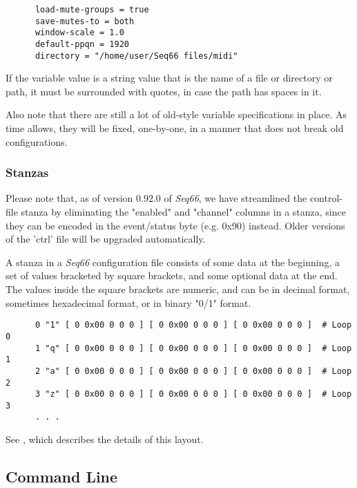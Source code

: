    \begin{verbatim}
      load-mute-groups = true
      save-mutes-to = both
      window-scale = 1.0
      default-ppqn = 1920
      directory = "/home/user/Seq66 files/midi"
   \end{verbatim}

   If the variable value is a string value that is the name of a file or
   directory or path, it must be surrounded with quotes, in case the path has
   spaces in it.

   Also note that there are still a lot of old-style variable specifications in
   place.  As time allows, they will be fixed, one-by-one, in a manner that
   does not break old configurations.

\subsubsection{Stanzas}
\label{subsec:configuration_common_stanzas}

   Please note that, as of version 0.92.0 of \textsl{Seq66}, we have
   streamlined the control-file stanza by eliminating the "enabled" and
   "channel" columns in a stanza, since they can be encoded in the event/status
   byte (e.g. 0x90) instead.  Older versions of the 'ctrl' file will be
   upgraded automatically.

   A stanza in a \textsl{Seq66} configuration file consists of some data at the
   beginning, a set of values bracketed by square brackets, and some optional
   data at the end.  The values inside the square brackets are numeric, and can
   be in decimal format, sometimes hexadecimal format, or in binary "0/1"
   format.

   \begin{verbatim}
      0 "1" [ 0 0x00 0 0 0 ] [ 0 0x00 0 0 0 ] [ 0 0x00 0 0 0 ]  # Loop 0
      1 "q" [ 0 0x00 0 0 0 ] [ 0 0x00 0 0 0 ] [ 0 0x00 0 0 0 ]  # Loop 1
      2 "a" [ 0 0x00 0 0 0 ] [ 0 0x00 0 0 0 ] [ 0 0x00 0 0 0 ]  # Loop 2
      3 "z" [ 0 0x00 0 0 0 ] [ 0 0x00 0 0 0 ] [ 0 0x00 0 0 0 ]  # Loop 3
      . . .
   \end{verbatim}

   See , which describes
   the details of this layout.

\subsection{Command Line}
\label{subsec:configuration_command_line}

